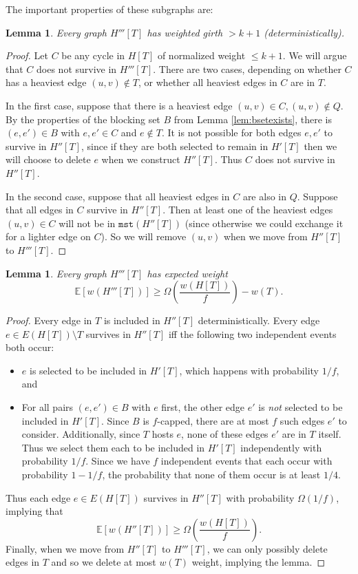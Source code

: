 \documentclass{article}
\theoremstyle{plain}
\newtheorem{lemma}[theorem]{Lemma}
\theoremstyle{definition}
\newcommand{\mst}{\texttt{mst}}
\begin{document}
The important properties of these subgraphs are:
\begin{lemma} \label{lem:highwg}
Every graph $H'''[T]$ has weighted girth $>k+1$ (deterministically).
\end{lemma}
\begin{proof}
Let $C$ be any cycle in $H[T]$ of normalized weight $\le k+1$.
We will argue that $C$ does not survive in $H'''[T]$.
There are two cases, depending on whether $C$ has a heaviest edge $(u, v) \notin T$, or whether all heaviest edges in $C$ are in $T$.

In the first case, suppose that there is a heaviest edge $(u, v) \in C, (u, v) \notin Q$.
By the properties of the blocking set $B$ from Lemma \ref{lem:bsetexists}, there is $(e, e') \in B$ with $e, e' \in C$ and $e \notin T$.
It is not possible for both edges $e, e'$ to survive in $H''[T]$, since if they are both selected to remain in $H'[T]$ then we will choose to delete $e$ when we construct $H''[T]$.
Thus $C$ does not survive in $H''[T]$.

In the second case, suppose that all heaviest edges in $C$ are also in $Q$.
Suppose that all edges in $C$ survive in $H''[T]$.
Then at least one of the heaviest edges $(u, v) \in C$ will not be in $\mst(H''[T])$ (since otherwise we could exchange it for a lighter edge on $C$).
So we will remove $(u, v)$ when we move from $H''[T]$ to $H'''[T]$.
\end{proof}

\begin{lemma} \label{lem:exphweight}
Every graph $H'''[T]$ has expected weight
$$\mathbb{E}\left[w(H'''[T])\right] \ge \Omega\left( \frac{w(H[T])}{f} \right) - w(T).$$
\end{lemma}
\begin{proof}
Every edge in $T$ is included in $H''[T]$ deterministically.
Every edge $e \in E(H[T]) \setminus T$ survives in $H''[T]$ iff the following two independent events both occur:
\begin{itemize}
\item $e$ is selected to be included in $H'[T]$, which happens with probability $1/f$, and
\item For all pairs $(e, e') \in B$ with $e$ first, the other edge $e'$ is \emph{not} selected to be included in $H'[T]$.
Since $B$ is $f$-capped, there are at most $f$ such edges $e'$ to consider.
Additionally, since $T$ hosts $e$, none of these edges $e'$ are in $T$ itself.
Thus we select them each to be included in $H'[T]$ independently with probability $1/f$.
Since we have $f$ independent events that each occur with probability $1 - 1/f$, the probability that none of them occur is at least $1/4$.
\end{itemize}
Thus each edge $e \in E(H[T])$ survives in $H''[T]$ with probability $\Omega(1/f)$, implying that
$$\mathbb{E}\left[w(H''[T])\right] \ge \Omega\left( \frac{w(H[T])}{f} \right).$$
Finally, when we move from $H''[T]$ to $H'''[T]$, we can only possibly delete edges in $T$ and so we delete at most $w(T)$ weight, implying the lemma.
\end{proof}
\end{document}
